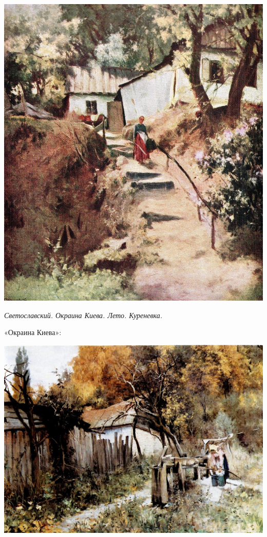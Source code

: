 \vspace*{\fill}
\begin{center}
\includegraphics[width=\linewidth]{chast-kirvys/svetosl/sveto-1890-okraina-kieva-leto-kurenevka.jpg}

\textit{Светославский. Окраина Киева. Лето. Куреневка.}
\end{center}

\vspace*{\fill}

\newpage

«Окраина Киева»:

\begin{center}
\includegraphics[width=\linewidth]{chast-kirvys/svetosl/sveto-1890-okraina-kieva.jpg}
\end{center}

